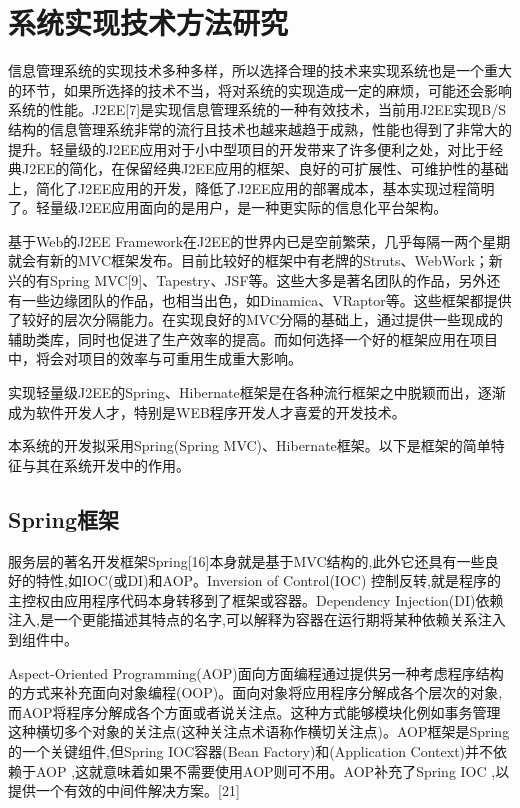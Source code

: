 
\chapter{系统实现技术方法研究}
信息管理系统的实现技术多种多样，所以选择合理的技术来实现系统也是一个重大的环节，如果所选择的技术不当，将对系统的实现造成一定的麻烦，可能还会影响系统的性能。J2EE[7]是实现信息管理系统的一种有效技术，当前用J2EE实现B/S结构的信息管理系统非常的流行且技术也越来越趋于成熟，性能也得到了非常大的提升。轻量级的J2EE应用对于小中型项目的开发带来了许多便利之处，对比于经典J2EE的简化，在保留经典J2EE应用的框架、良好的可扩展性、可维护性的基础上，简化了J2EE应用的开发，降低了J2EE应用的部署成本，基本实现过程简明了。轻量级J2EE应用面向的是用户，是一种更实际的信息化平台架构。

基于Web的J2EE Framework在J2EE的世界内已是空前繁荣，几乎每隔一两个星期就会有新的MVC框架发布。目前比较好的框架中有老牌的Struts、WebWork；新兴的有Spring MVC[9]、Tapestry、JSF等。这些大多是著名团队的作品，另外还有一些边缘团队的作品，也相当出色，如Dinamica、VRaptor等。这些框架都提供了较好的层次分隔能力。在实现良好的MVC分隔的基础上，通过提供一些现成的辅助类库，同时也促进了生产效率的提高。而如何选择一个好的框架应用在项目中，将会对项目的效率与可重用生成重大影响。

实现轻量级J2EE的Spring、Hibernate框架是在各种流行框架之中脱颖而出，逐渐成为软件开发人才，特别是WEB程序开发人才喜爱的开发技术。

本系统的开发拟采用Spring(Spring MVC)、Hibernate框架。以下是框架的简单特征与其在系统开发中的作用。

\section{Spring框架}
服务层的著名开发框架Spring[16]本身就是基于MVC结构的,此外它还具有一些良好的特性,如IOC(或DI)和AOP。Inversion of Control(IOC) 控制反转,就是程序的主控权由应用程序代码本身转移到了框架或容器。Dependency Injection(DI)依赖注入,是一个更能描述其特点的名字,可以解释为容器在运行期将某种依赖关系注入到组件中。

Aspect-Oriented Programming(AOP)面向方面编程通过提供另一种考虑程序结构的方式来补充面向对象编程(OOP)。面向对象将应用程序分解成各个层次的对象,而AOP将程序分解成各个方面或者说关注点。这种方式能够模块化例如事务管理这种横切多个对象的关注点(这种关注点术语称作横切关注点)。AOP框架是Spring的一个关键组件,但Spring IOC容器(Bean Factory)和(Application Context)并不依赖于AOP ,这就意味着如果不需要使用AOP则可不用。AOP补充了Spring IOC ,以提供一个有效的中间件解决方案。[21]


